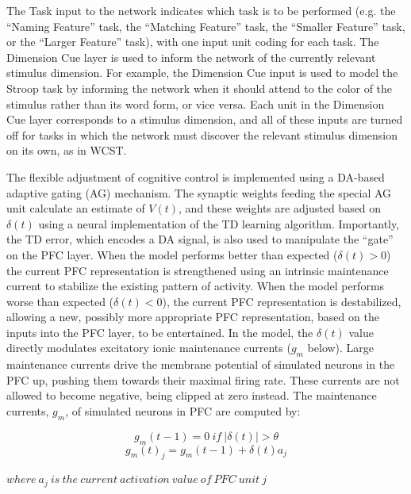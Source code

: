 The Task input to the network indicates which task is to be performed (e.g. the ``Naming Feature'' task, the ``Matching Feature'' task, the ``Smaller Feature'' task, or the ``Larger Feature'' task),
with one input unit coding for each task.  The Dimension Cue layer is
used to inform the network of the currently relevant stimulus
dimension.  For example, the Dimension Cue input is used to model the
Stroop task by informing the network when it should attend to the
color of the stimulus rather than its word form, or vice versa.  Each
unit in the Dimension Cue layer corresponds to a stimulus dimension,
and all of these inputs are turned off for tasks in which the network
must discover the relevant stimulus dimension on its own, as in WCST.

The flexible adjustment of cognitive control is implemented using a
DA-based adaptive gating (AG) mechanism.  The synaptic weights feeding
the special AG unit calculate an estimate of $V(t)$, and these weights
are adjusted based on $\delta(t)$ using a neural implementation of the
TD learning algorithm.  Importantly, the TD error, which encodes a DA
signal, is also used to manipulate the ``gate'' on the PFC layer.
When the model performs better than expected ($\delta(t) > 0$) the
current PFC representation is strengthened using an intrinsic
maintenance current to stabilize the existing pattern of activity.
When the model performs worse than expected ($\delta(t) < 0$), the
current PFC representation is destabilized, allowing a new, possibly
more appropriate PFC representation, based on the inputs into the PFC
layer, to be entertained.  In the model, the \begin{math}\delta(t)\end{math} value directly modulates excitatory ionic maintenance currents (\begin{math}g_m\end{math} below).  Large maintenance currents drive the membrane potential of simulated neurons in the PFC up, pushing them towards their maximal firing rate.  These currents are not allowed to become negative, being clipped at zero instead.  The maintenance currents, $g_m$, of simulated neurons in PFC are computed by:

\begin{equation}g_m(t-1) = 0 ~if~ |\delta(t)| > \theta\end{equation}
\begin{equation}g_m(t)_j = g_m(t-1) + \delta(t) a_j\end{equation}
\begin{center}$where~a_j~is~the~current~activation~value~of~PFC~unit~j$\end{center}

